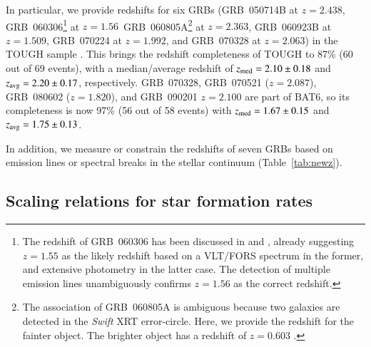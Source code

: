 \documentclass[traditabstract, longauth]{aa}
\begin{document}
In particular, we provide redshifts for six GRBs (GRB~050714B at $z=2.438$, GRB~060306\footnote{The redshift of GRB~060306 has been discussed in \citet{2012ApJ...752...62J} and \citet{2013ApJ...778..128P}, already suggesting $z=1.55$ as the likely redshift based on a VLT/FORS spectrum in the former, and extensive photometry in the latter case. The detection of multiple emission lines unambiguously confirms $z=1.56$ as the correct redshift.} at $z=1.56$\, GRB~060805A\footnote{The association of GRB~060805A is ambiguous because two galaxies are detected in the \textit{Swift} XRT error-circle. Here, we provide the redshift for the fainter object. The brighter object has a redshift of $z=0.603$ \citep{2012ApJ...752...62J}.} at $z=2.363$, GRB~060923B at $z=1.509$, GRB~070224 at $z=1.992$, and GRB~070328 at $z=2.063$) in the TOUGH sample \citep{2012ApJ...756..187H}. This brings the redshift completeness of TOUGH to 87\% (60 out of 69 events), with a median/average redshift of $z_{\rm{med}} = 2.10\pm0.18$ and $z_{\rm{avg}}= 2.20\pm0.17$, respectively. GRB~070328, GRB~070521 ($z=2.087$), GRB~080602 ($z=1.820$), and GRB~090201 $z=2.100$ are part of BAT6, so its completeness is now 97\% (56 out of 58 events) with $z_{\rm{med}} = 1.67\pm0.15$ and $z_{\rm{avg}}= 1.75\pm0.13$.

In addition, we measure or constrain the redshifts of seven GRBs based on emission lines or spectral breaks in the stellar continuum  (Table~\ref{tab:newz}). 



\subsection{Scaling relations for star formation rates}
\label{sec:newsc}
\end{document}
